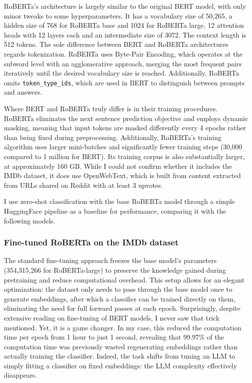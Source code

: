 \documentclass{article}
\begin{document}
RoBERTa's architecture is largely similar to the original BERT model, with only minor tweaks to some hyperparameters. It has a vocabulary size of 50,265, a hidden size of 768 for RoBERTa base and 1024 for RoBERTa large, 12 attention heads with 12 layers each and an intermediate size of 3072. The context length is 512 tokens. The sole difference between BERT and RoBERTa architectures regards tokenization. RoBERTa uses Byte-Pair Encoding, which operates at the subword level with an agglomerative approach, merging the most frequent pairs iteratively until the desired vocabulary size is reached. Additionally, RoBERTa omits \texttt{token\_type\_ids}, which are used in BERT to distinguish between prompts and answers.

Where BERT and RoBERTa truly differ is in their training procedures. RoBERTa eliminates the next sentence prediction objective and employs dynamic masking, meaning that input tokens are masked differently every 4 epochs rather than being fixed during preprocessing. Additionally, RoBERTa's training algorithm uses larger mini-batches and significantly fewer training steps (30,000 compared to 1 million for BERT). Its training corpus is also substantially larger, at approximately 160 GB. While I could not confirm whether it includes the IMDb dataset, it does use OpenWebText, which is built from content extracted from URLs shared on Reddit with at least 3 upvotes.

I use zero-shot classification with the base RoBERTa model through a simple HuggingFace pipeline as a baseline for performance, comparing it with the following models.

\subsubsection{Fine-tuned RoBERTa on the IMDb dataset}

The standard fine-tuning approach freezes the base model's parameters (354,315,266 for RoBERTa-large) to preserve the knowledge gained during pretraining and reduce computational overhead. This setup allows for an elegant optimization: the dataset only needs to pass through the base model once to generate embeddings, after which a classifier can be trained directly on them, eliminating the need for full forward passes at each epoch. Surprisingly, despite extensive reading on fine-tuning of BERT models, I never saw that trick mentioned. Yet, it is a game changer. In my case, this reduced the computation time per epoch from 1 hour to just 1 second, revealing that 99.97\% of the computation time was previously wasted regenerating embeddings rather than actually training the classifier. Indeed, the task shifts from tuning an LLM to simply fitting a classifier on fixed embeddings: the LLM complexity effectively disappears.
\end{document}
